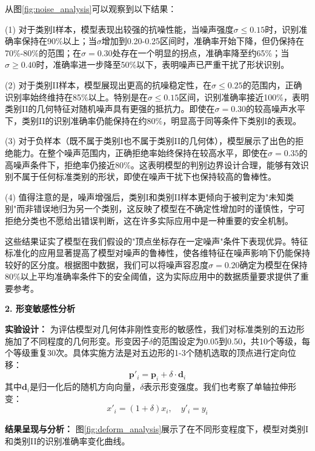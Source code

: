从图\ref{fig:noise_analysis}可以观察到以下结果：

(1) 对于类别I样本，模型表现出较强的抗噪性能，当噪声强度$\sigma \leq 0.15$时，识别准确率保持在90\%以上；当$\sigma$增加到0.20-0.25区间时，准确率开始下降，但仍保持在70\%-80\%的范围；在$\sigma = 0.30$处存在一个明显的拐点，准确率降至约65\%；当$\sigma \geq 0.40$时，准确率进一步降至50\%以下，表明噪声已严重干扰了形状识别。

(2) 对于类别II样本，模型展现出更高的抗噪稳定性，在$\sigma \leq 0.25$的范围内，正确识别率始终维持在85\%以上。特别是在$\sigma \leq 0.15$区间，识别准确率接近100\%，表明类别II的几何特征对随机噪声具有更强的抵抗力。即使在$\sigma = 0.30$的较高噪声水平下，类别II的识别准确率仍能保持在约80\%，明显高于同等条件下类别I的表现。

(3) 对于负样本（既不属于类别I也不属于类别II的几何体），模型展示了出色的拒绝能力。在整个噪声范围内，正确拒绝率始终保持在较高水平，即使在$\sigma = 0.35$的高噪声条件下，拒绝率仍接近80\%。这表明模型的判别边界设计合理，能够有效识别不属于任何标准类别的形状，即使在噪声干扰下也保持较高的鲁棒性。

(4) 值得注意的是，噪声增强后，类别I和类别II样本更倾向于被判定为"未知类别"而非错误地归为另一个类别，这反映了模型在不确定性增加时的谨慎性，宁可拒绝分类也不愿给出错误判断，这在许多实际应用中是一种重要的安全机制。

这些结果证实了模型在我们假设的"顶点坐标存在一定噪声"条件下表现优异。特征标准化的应用显著提高了模型对噪声的鲁棒性，使各维特征在噪声影响下仍能保持较好的区分度。根据图中数据，我们可以将噪声容忍度$\sigma = 0.20$确定为模型在保持80\%以上平均准确率条件下的安全阈值，这为实际应用中的数据质量要求提供了重要参考。

\textbf{2. 形变敏感性分析}

\textbf{实验设计：} 为评估模型对几何体非刚性变形的敏感性，我们对标准类别的五边形施加了不同程度的几何形变。形变因子$\delta$的范围设定为0.05到0.50，共10个等级，每个等级重复30次。具体实施方法是对五边形的1-3个随机选取的顶点进行定向位移：
\begin{equation}
    \mathbf{p}'_i = \mathbf{p}_i + \delta \cdot \mathbf{d}_i
\end{equation}
其中$\mathbf{d}_i$是归一化后的随机方向向量，$\delta$表示形变强度。我们也考察了单轴拉伸形变：
\begin{equation}
    x'_i = (1 + \delta)x_i, \quad y'_i = y_i
\end{equation}

\textbf{结果呈现与分析：} 图\ref{fig:deform_analysis}展示了在不同形变程度下，模型对类别I和类别II的识别准确率变化曲线。


